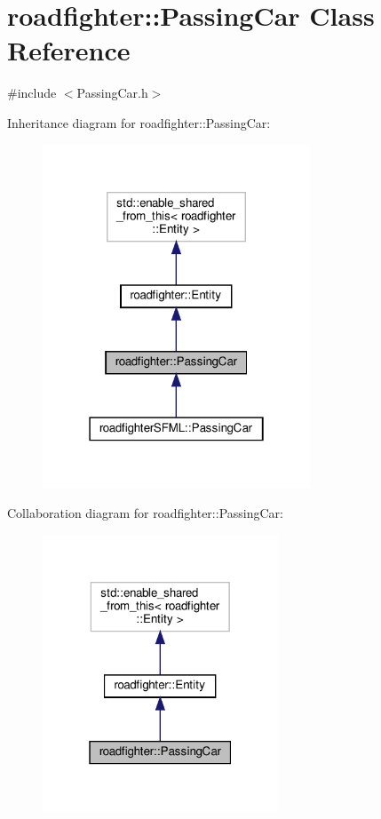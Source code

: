 \hypertarget{classroadfighter_1_1PassingCar}{}\section{roadfighter\+:\+:Passing\+Car Class Reference}
\label{classroadfighter_1_1PassingCar}


{\ttfamily \#include $<$Passing\+Car.\+h$>$}



Inheritance diagram for roadfighter\+:\+:Passing\+Car\+:\nopagebreak
\begin{figure}[H]
\begin{center}
\leavevmode
\includegraphics[width=226pt]{classroadfighter_1_1PassingCar__inherit__graph}
\end{center}
\end{figure}


Collaboration diagram for roadfighter\+:\+:Passing\+Car\+:\nopagebreak
\begin{figure}[H]
\begin{center}
\leavevmode
\includegraphics[width=199pt]{classroadfighter_1_1PassingCar__coll__graph}
\end{center}
\end{figure}
